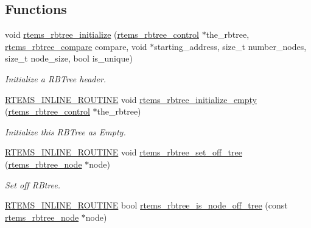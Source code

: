 \subsection*{Functions}
\begin{DoxyCompactItemize}
\item 
void \mbox{\hyperlink{group__ClassicRBTrees_gaa246868bc29eb945e72a11be3fc98f14}{rtems\+\_\+rbtree\+\_\+initialize}} (\mbox{\hyperlink{group__ClassicRBTrees_ga21fe446d0b3cb8b25c814e93357753ef}{rtems\+\_\+rbtree\+\_\+control}} $\ast$the\+\_\+rbtree, \mbox{\hyperlink{group__ClassicRBTrees_gae5f1cdaef7551cbee5a877e65f442b93}{rtems\+\_\+rbtree\+\_\+compare}} compare, void $\ast$starting\+\_\+address, size\+\_\+t number\+\_\+nodes, size\+\_\+t node\+\_\+size, bool is\+\_\+unique)
\begin{DoxyCompactList}\small\item\em Initialize a R\+B\+Tree header. \end{DoxyCompactList}\item 
\mbox{\hyperlink{group__RTEMSScoreBaseDefs_gac216239df231d5dbd15e3520b0b9313f}{R\+T\+E\+M\+S\+\_\+\+I\+N\+L\+I\+N\+E\+\_\+\+R\+O\+U\+T\+I\+NE}} void \mbox{\hyperlink{group__ClassicRBTrees_gafe623affef1c0e550b64bbaf12544488}{rtems\+\_\+rbtree\+\_\+initialize\+\_\+empty}} (\mbox{\hyperlink{group__ClassicRBTrees_ga21fe446d0b3cb8b25c814e93357753ef}{rtems\+\_\+rbtree\+\_\+control}} $\ast$the\+\_\+rbtree)
\begin{DoxyCompactList}\small\item\em Initialize this R\+B\+Tree as Empty. \end{DoxyCompactList}\item 
\mbox{\hyperlink{group__RTEMSScoreBaseDefs_gac216239df231d5dbd15e3520b0b9313f}{R\+T\+E\+M\+S\+\_\+\+I\+N\+L\+I\+N\+E\+\_\+\+R\+O\+U\+T\+I\+NE}} void \mbox{\hyperlink{group__ClassicRBTrees_gaeeee1471df6437621cee7d5f80c37f2d}{rtems\+\_\+rbtree\+\_\+set\+\_\+off\+\_\+tree}} (\mbox{\hyperlink{group__ClassicRBTrees_gaef47fc7fc61856c9afbf7f18a26ff80d}{rtems\+\_\+rbtree\+\_\+node}} $\ast$node)
\begin{DoxyCompactList}\small\item\em Set off R\+Btree. \end{DoxyCompactList}\item 
\mbox{\hyperlink{group__RTEMSScoreBaseDefs_gac216239df231d5dbd15e3520b0b9313f}{R\+T\+E\+M\+S\+\_\+\+I\+N\+L\+I\+N\+E\+\_\+\+R\+O\+U\+T\+I\+NE}} bool \mbox{\hyperlink{group__ClassicRBTrees_ga3effd176d616ee063b3619ce6aeba0ad}{rtems\+\_\+rbtree\+\_\+is\+\_\+node\+\_\+off\+\_\+tree}} (const \mbox{\hyperlink{group__ClassicRBTrees_gaef47fc7fc61856c9afbf7f18a26ff80d}{rtems\+\_\+rbtree\+\_\+node}} $\ast$node)

\end{DoxyCompactItemize}
